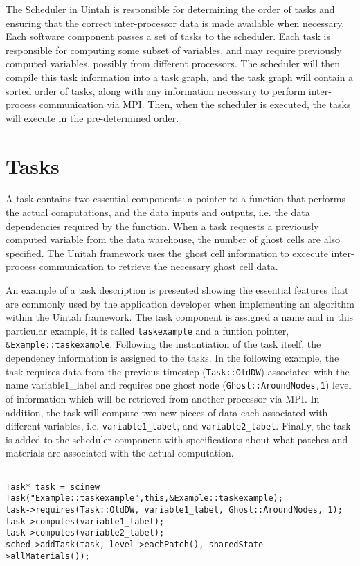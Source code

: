\documentclass[12pt]{report}
\begin{document}
The Scheduler in Uintah is responsible for determining the order of
tasks and ensuring that the correct inter-processor data is made
available when necessary. Each software component passes a set of
tasks to the scheduler. Each task is responsible for computing some
subset of variables, and may require previously computed variables,
possibly from different processors. The scheduler will then compile
this task information into a task graph, and the task graph will
contain a sorted order of tasks, along with any information necessary
to perform inter-process communication via MPI. Then, when the
scheduler is executed, the tasks will execute in the pre-determined
order.

\section{Tasks}

A task contains two essential components: a pointer to a function
that performs the actual computations, and the data inputs and
outputs, i.e. the data dependencies required by the function.  When a
task requests a previously computed variable from the data warehouse,
the number of ghost cells are also specified.  The Unitah framework
uses the ghost cell information to excecute inter-process
communication to retrieve the necessary ghost cell data.

An example of a task description is presented showing the essential
features that are commonly used by the application developer when
implementing an algorithm within the Uintah framework.  The task
component is assigned a name and in this particular example, it is
called \texttt{taskexample} and a funtion pointer,
\texttt{\&Example::taskexample}.  Following the instantiation of the
task itself, the dependency information is assigned to the tasks.  In
the following example, the task requires data from the previous
timestep (\texttt{Task::OldDW}) associated with the name
variable1\_label and requires one ghost node
(\texttt{Ghost::AroundNodes,1}) level of information which will be
retrieved from another processor via MPI.  In addition, the task will
compute two new pieces of data each associated with different
variables, i.e. \texttt{variable1\_label}, and
\texttt{variable2\_label}.  Finally, the task is added to the scheduler
component with specifications about what patches and materials are
associated with the actual computation.

\begin{verbatim}

Task* task = scinew Task("Example::taskexample",this,&Example::taskexample);
task->requires(Task::OldDW, variable1_label, Ghost::AroundNodes, 1);
task->computes(variable1_label);
task->computes(variable2_label);
sched->addTask(task, level->eachPatch(), sharedState_->allMaterials());


\end{verbatim}
\end{document}
